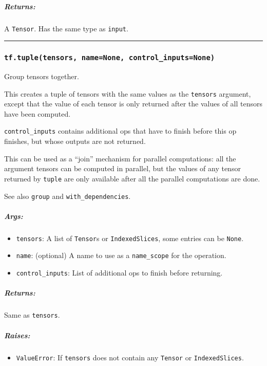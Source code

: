 \subparagraph{Returns: }\label{returns}

A \texttt{Tensor}. Has the same type as \texttt{input}.

\begin{center}\rule{0.5\linewidth}{\linethickness}\end{center}

\subsubsection{\texorpdfstring{\texttt{tf.tuple(tensors,\ name=None,\ control\_inputs=None)}
}{tf.tuple(tensors, name=None, control\_inputs=None) }}\label{tf.tupletensors-namenone-controlux5finputsnone}

Group tensors together.

This creates a tuple of tensors with the same values as the
\texttt{tensors} argument, except that the value of each tensor is only
returned after the values of all tensors have been computed.

\texttt{control\_inputs} contains additional ops that have to finish
before this op finishes, but whose outputs are not returned.

This can be used as a ``join'' mechanism for parallel computations: all
the argument tensors can be computed in parallel, but the values of any
tensor returned by \texttt{tuple} are only available after all the
parallel computations are done.

See also \texttt{group} and \texttt{with\_dependencies}.

\subparagraph{Args: }\label{args-1}

\begin{itemize}
\tightlist
\item
  \texttt{tensors}: A list of \texttt{Tensor}s or
  \texttt{IndexedSlices}, some entries can be \texttt{None}.
\item
  \texttt{name}: (optional) A name to use as a \texttt{name\_scope} for
  the operation.
\item
  \texttt{control\_inputs}: List of additional ops to finish before
  returning.
\end{itemize}

\subparagraph{Returns: }\label{returns-1}

Same as \texttt{tensors}.

\subparagraph{Raises: }\label{raises}

\begin{itemize}
\tightlist
\item
  \texttt{ValueError}: If \texttt{tensors} does not contain any
  \texttt{Tensor} or \texttt{IndexedSlices}.
\end{itemize}

